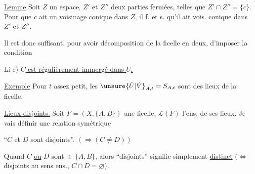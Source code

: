 \uline{Lemme} Soit $Z$ un espace, $Z'$ et $Z''$ deux parties fermées, telles que
$Z'\cap Z''=\{c\}$.
Pour que $c$ ait un voisinage conique dans $Z$, il f. et s. qu'il ait vois. conique dans $Z'$ et $Z''$.

Il est donc suffisant, pour avoir  décomposition de la ficelle en deux, d'imposer la condition

Li c) \uline{$C$ est régulièrement immergé dans $U$.}

\uline{Exemple} Pour $t$ assez petit, les $\unsure{\dot U|\dot V}_{A,t}=S_{A,t}$ sont des  lieux de la ficelle.



\uline{Lieux disjoints.}
Soit $F=(X,\{A,B\})$ une ficelle, $\mathcal L(F)$ l'ens. de ses lieux.
Je vais définir une relation symétrique

``$C$ et $D$ sont disjoints''. \qquad $(\Longrightarrow(C\ne D))$

Quand $C$ \uline{ou} $D$ sont $\in\{A,B\}$, alors
``disjoints'' signifie simplement \uline{distinct}
($\Longleftrightarrow$ disjoints au sens ens., $C\cap D=\varnothing$).


